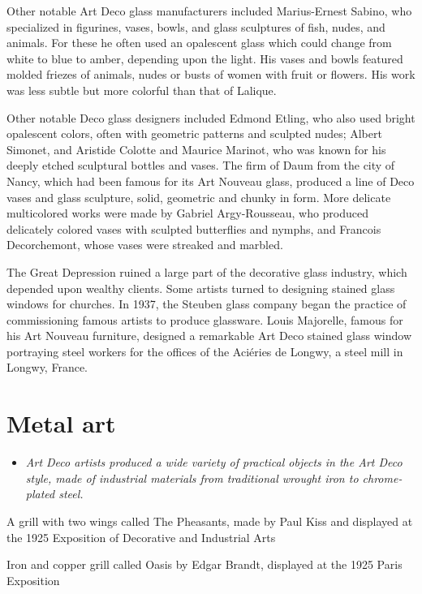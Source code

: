 Other notable Art Deco glass manufacturers included Marius-Ernest
Sabino, who specialized in figurines, vases, bowls, and glass sculptures
of fish, nudes, and animals. For these he often used an opalescent glass
which could change from white to blue to amber, depending upon the
light. His vases and bowls featured molded friezes of animals, nudes or
busts of women with fruit or flowers. His work was less subtle but more
colorful than that of Lalique.

Other notable Deco glass designers included Edmond Etling, who also used
bright opalescent colors, often with geometric patterns and sculpted
nudes; Albert Simonet, and Aristide Colotte and Maurice Marinot, who was
known for his deeply etched sculptural bottles and vases. The firm of
Daum from the city of Nancy, which had been famous for its Art Nouveau
glass, produced a line of Deco vases and glass sculpture, solid,
geometric and chunky in form. More delicate multicolored works were made
by Gabriel Argy-Rousseau, who produced delicately colored vases with
sculpted butterflies and nymphs, and Francois Decorchemont, whose vases
were streaked and marbled.

The Great Depression ruined a large part of the decorative glass
industry, which depended upon wealthy clients. Some artists turned to
designing stained glass windows for churches. In 1937, the Steuben glass
company began the practice of commissioning famous artists to produce
glassware. Louis Majorelle, famous for his Art Nouveau furniture,
designed a remarkable Art Deco stained glass window portraying steel
workers for the offices of the Aciéries de Longwy, a steel mill in
Longwy, France.

\section{Metal art}\label{metal-art}

\begin{itemize}
\item
  \emph{Art Deco artists produced a wide variety of practical objects in
  the Art Deco style, made of industrial materials from traditional
  wrought iron to chrome-plated steel.}
\end{itemize}

A grill with two wings called The Pheasants, made by Paul Kiss and
displayed at the 1925 Exposition of Decorative and Industrial Arts

Iron and copper grill called Oasis by Edgar Brandt, displayed at the
1925 Paris Exposition

